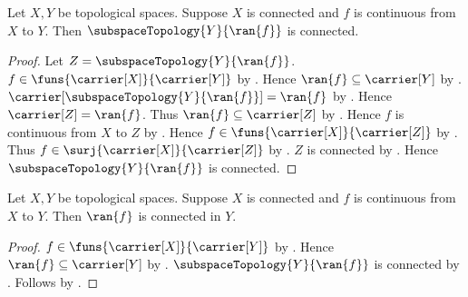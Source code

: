 \begin{theorem}\label{continuous_range_subspace_is_connected}
    Let $X,Y$ be topological spaces.
    Suppose $X$ is connected and $f$ is continuous from $X$ to $Y$.
    Then $\subspaceTopology{Y}{\ran{f}}$ is connected.
\end{theorem}
\begin{proof}
    Let $Z=\subspaceTopology{Y}{\ran{f}}$.
    $f\in\funs{\carrier[X]}{\carrier[Y]}$ by
        .
    Hence $\ran{f}\subseteq\carrier[Y]$ by .
    $\carrier[\subspaceTopology{Y}{\ran{f}}]=\ran{f}$ by
        .
    Hence $\carrier[Z]=\ran{f}$.
    Thus $\ran{f}\subseteq\carrier[Z]$ by .
    Hence $f$ is continuous from $X$ to $Z$ by
        .
    Hence $f\in\funs{\carrier[X]}{\carrier[Z]}$ by
        .
    Thus $f\in\surj{\carrier[X]}{\carrier[Z]}$ by
        .
    $Z$ is connected by .
    Hence $\subspaceTopology{Y}{\ran{f}}$ is connected.
\end{proof}

\begin{corollary}\label{continuous_image_is_connected}
    Let $X,Y$ be topological spaces.
    Suppose $X$ is connected and $f$ is continuous from $X$ to $Y$.
    Then $\ran{f}$ is connected in $Y$.
\end{corollary}
\begin{proof}
    $f\in\funs{\carrier[X]}{\carrier[Y]}$ by
        .
    Hence $\ran{f}\subseteq\carrier[Y]$ by .
    $\subspaceTopology{Y}{\ran{f}}$ is connected by
        .
    Follows by .
\end{proof}
